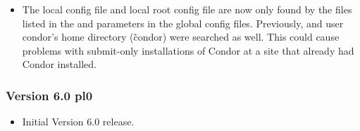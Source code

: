 \begin{itemize}
\item The local config file and local root config file are now only
found by the files listed in the  and
 parameters in the global config
files.
Previously,  and user condor's home directory
(\~condor) were searched as well.
This could cause problems with submit-only installations of Condor at
a site that already had Condor installed.

\end{itemize}

\subsubsection{\label{sec:New-6-0-pl0}Version 6.0 pl0}

\begin{itemize}

\item Initial Version 6.0 release.

\end{itemize}

